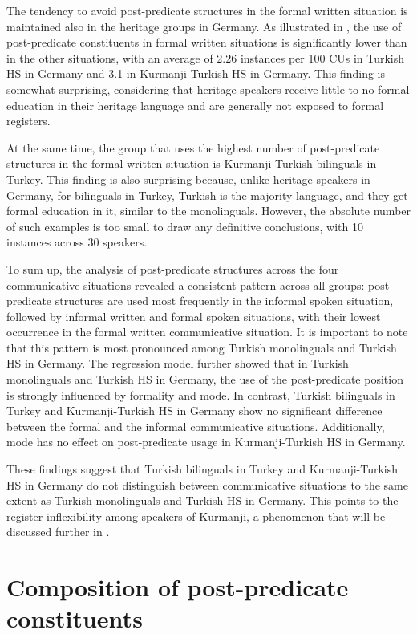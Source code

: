 The tendency to avoid post-predicate structures in the formal written situation is maintained also in the heritage groups in Germany. As illustrated in , the use of post-predicate constituents in formal written situations is significantly lower than in the other situations, with an average of 2.26 instances per 100 CUs in Turkish HS in Germany and 3.1 in Kurmanji-Turkish HS in Germany. This finding is somewhat surprising, considering that heritage speakers receive little to no formal education in their heritage language and are generally not exposed to formal registers.

At the same time, the group that uses the highest number of post-predicate structures in the formal written situation is Kurmanji-Turkish bilinguals in Turkey. This finding is also surprising because, unlike heritage speakers in Germany, for bilinguals in Turkey, Turkish is the majority language, and they get formal education in it, similar to the monolinguals. However, the absolute number of such examples is too small to draw any definitive conclusions, with 10 instances across 30 speakers.

To sum up, the analysis of post-predicate structures across the four communicative situations revealed a consistent pattern across all groups: post-predicate structures are used most frequently in the informal spoken situation, followed by informal written and formal spoken situations, with their lowest occurrence in the formal written communicative situation. It is important to note that this pattern is most pronounced among Turkish monolinguals and Turkish HS in Germany. The regression model further showed that in Turkish monolinguals and Turkish HS in Germany, the use of the post-predicate position is strongly influenced by formality and mode. In contrast, Turkish bilinguals in Turkey and Kurmanji-Turkish HS in Germany show no significant difference between the formal and the informal communicative situations. Additionally, mode has no effect on post-predicate usage in Kurmanji-Turkish HS in Germany.

These findings suggest that Turkish bilinguals in Turkey and Kurmanji-Turkish HS in Germany do not distinguish between communicative situations to the same extent as Turkish monolinguals and Turkish HS in Germany. This points to the register inflexibility among speakers of Kurmanji, a phenomenon that will be discussed further in .

\section{Composition of post-predicate constituents}\label{sec:key:5.3}

